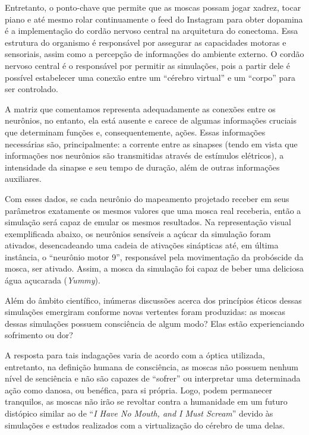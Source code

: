 {Entretanto, o ponto-chave que permite que as moscas possam jogar xadrez, tocar piano e até mesmo rolar continuamente o feed do Instagram para obter dopamina é a implementação do cordão nervoso central na arquitetura do conectoma. Essa estrutura do organismo é responsável por assegurar as capacidades motoras e sensoriais, assim como a percepção de informações do ambiente externo. O cordão nervoso central é o responsável por permitir as simulações, pois a partir dele é possível estabelecer uma conexão entre um ``cérebro virtual'' e um ``corpo'' para ser controlado.


A matriz que comentamos representa adequadamente as conexões entre os neurônios, no entanto, ela está ausente e carece de algumas informações cruciais que determinam funções e, consequentemente, ações. Essas informações necessárias são, principalmente: a corrente entre as sinapses (tendo em vista que informações nos neurônios são transmitidas através de estímulos elétricos), a intensidade da sinapse e seu tempo de duração, além de outras informações auxiliares.

Com esses dados, se cada neurônio do mapeamento projetado receber em seus parâmetros exatamente os mesmos valores que uma mosca real receberia, então a simulação será capaz de emular os mesmos resultados. Na representação visual exemplificada abaixo, os neurônios sensíveis a açúcar da simulação foram ativados, desencadeando uma cadeia de ativações sinápticas até, em última instância, o ``neurônio motor 9'', responsável pela movimentação da probóscide da mosca, ser ativado. Assim, a mosca da simulação foi capaz de beber uma deliciosa água açucarada (\textit{Yummy}).


Além do âmbito científico, inúmeras discussões acerca dos princípios éticos dessas simulações emergiram conforme novas vertentes foram produzidas: as moscas dessas simulações possuem consciência de algum modo? Elas estão experienciando sofrimento ou dor?

A resposta para tais indagações varia de acordo com a óptica utilizada, entretanto, na definição humana de consciência, as moscas não possuem nenhum nível de senciência e não são capazes de ``sofrer'' ou interpretar uma determinada ação como danosa, ou benéfica, para si própria. Logo, podem permanecer tranquilos, as moscas não irão se revoltar contra a humanidade em um futuro distópico similar ao de ``\textit{I Have No Mouth, and I Must Scream}'' devido às simulações e estudos realizados com a virtualização do cérebro de uma delas.

}
